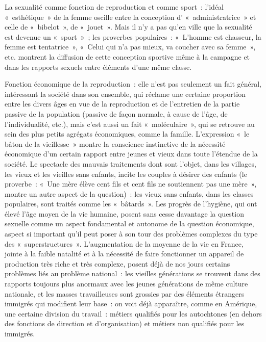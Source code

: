 \documentclass[french,twoside]{book} %
\begin{document}
La sexualité comme fonction de reproduction et comme sport : l’idéal « esthétique » de la femme oscille entre la conception d’ « administratrice » et celle de « bibelot », de « jouet ». Mais il n’y a pas qu’en ville que la sexualité est devenue un « sport » ; les proverbes populaires : « L'homme est chasseur, la femme est tentatrice », « Celui qui n’a pas mieux, va coucher avec sa femme », etc. montrent la diffusion de cette conception sportive même à la campagne et dans les rapports sexuels entre éléments d’une même classe.\par
Fonction économique de la reproduction : elle n’est pas seulement un fait général, intéressant la société dans son ensemble, qui réclame une certaine proportion entre les divers âges en vue de la reproduction et de l’entretien de la partie passive de la population (passive de façon normale, à cause de l’âge, de l’individualité, etc.), mais c’est aussi un fait « moléculaire », qui se retrouve au sein des plus petits agrégats économiques, comme la famille. L'expression « le bâton de la vieillesse » montre la conscience instinctive de la nécessité économique d’un certain rapport entre jeunes et vieux dans toute l’étendue de la société. Le spectacle des mauvais traitements dont sont l’objet, dans les villages, les vieux et les vieilles sans enfants, incite les couples à désirer des enfants (le proverbe : « Une mère élève cent fils et cent fils ne soutiennent pas une mère », montre un autre aspect de la question) : les vieux sans enfants, dans les classes populaires, sont traités comme les « bâtards ». Les progrès de l’hygiène, qui ont élevé l’âge moyen de la vie humaine, posent sans cesse davantage la question sexuelle comme un aspect fondamental et autonome de la question économique, aspect si important qu’il peut poser à son tour des problèmes complexes du type des « superstructures ». L'augmentation de la moyenne de la vie en France, jointe à la faible natalité et à la nécessité de faire fonctionner un appareil de production très riche et très complexe, posent déjà de nos jours certains problèmes liés au problème national : les vieilles générations se trouvent dans des rapports toujours plus anormaux avec les jeunes générations de même culture nationale, et les masses travailleuses sont grossies par des éléments étrangers immigrés qui modifient leur base : on voit déjà apparaître, comme en Amérique, une certaine division du travail : métiers qualifiés pour les autochtones (en dehors des fonctions de direction et d’organisation) et métiers non qualifiés pour les immigrés.\par
\end{document}

